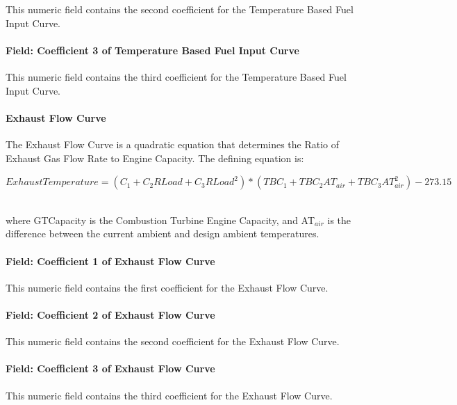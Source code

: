 This numeric field contains the second coefficient for the Temperature Based Fuel Input Curve.

\paragraph{Field: Coefficient 3 of Temperature Based Fuel Input Curve}\label{field-coefficient-3-of-temperature-based-fuel-input-curve}

This numeric field contains the third coefficient for the Temperature Based Fuel Input Curve.

\paragraph{Exhaust Flow Curve}\label{exhaust-flow-curve}

The Exhaust Flow Curve is a quadratic equation that determines the Ratio of Exhaust Gas Flow Rate to Engine Capacity. The defining equation is:

\emph{\(ExhaustTemperature = ({C_1} + {C_2}RLoad + {C_3}RLoa{d^2}) * (TB{C_1} + TB{C_2}A{T_{air}} + TB{C_3}AT_{air}^2) - 273.15\) ~}

where GTCapacity is the Combustion Turbine Engine Capacity, and AT\(_{air}\) is the difference between the current ambient and design ambient temperatures.

\paragraph{Field: Coefficient 1 of Exhaust Flow Curve}\label{field-coefficient-1-of-exhaust-flow-curve}

This numeric field contains the first coefficient for the Exhaust Flow Curve.

\paragraph{Field: Coefficient 2 of Exhaust Flow Curve}\label{field-coefficient-2-of-exhaust-flow-curve}

This numeric field contains the second coefficient for the Exhaust Flow Curve.

\paragraph{Field: Coefficient 3 of Exhaust Flow Curve}\label{field-coefficient-3-of-exhaust-flow-curve}

This numeric field contains the third coefficient for the Exhaust Flow Curve.


